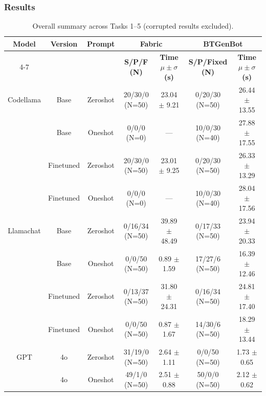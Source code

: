 \documentclass[letterpaper, 10pt, conference]{ieeeconf}      %
\begin{document}
\subsubsection{Results}

\begin{table}[t]
\centering
\vspace{2ex} 
\caption{Overall summary across Tasks 1--5 (corrupted results excluded).}
\label{Table-Eval-Overall}
\vspace{1ex} 
    \begin{tabular}{|c|c|c|cc|cc|}
    \hline
    \textbf{Model} & \textbf{Version} & \textbf{Prompt} & \multicolumn{2}{c|}{\textbf{Fabric}} & \multicolumn{2}{c|}{\textbf{BTGenBot}} \\
    \cline{4-7}
    & & & \textbf{S/P/F (N)} & \textbf{Time $\mu\pm\sigma$ (s)} & \textbf{S/P/Fixed (N)} & \textbf{Time $\mu\pm\sigma$ (s)} \\
    \hline
    Codellama & Base      & Zeroshot & 20/30/0 (N=50) & 23.04 $\pm$ 9.21 & 0/20/30 (N=50) & 26.44 $\pm$ 13.55 \\
              & Base      & Oneshot  & 0/0/0 (N=0)    & ---              & 10/0/30 (N=40) & 27.88 $\pm$ 17.55 \\
              & Finetuned & Zeroshot & 20/30/0 (N=50) & 23.01 $\pm$ 9.25 & 0/20/30 (N=50) & 26.33 $\pm$ 13.29 \\
              & Finetuned & Oneshot  & 0/0/0 (N=0)    & ---              & 10/0/30 (N=40) & 28.04 $\pm$ 17.56 \\
    \hline
    Llamachat & Base      & Zeroshot & 0/16/34 (N=50) & 39.89 $\pm$ 48.49 & 0/17/33 (N=50) & 23.94 $\pm$ 20.33 \\
              & Base      & Oneshot  & 0/0/50 (N=50)  & 0.89 $\pm$ 1.59  & 17/27/6 (N=50) & 16.39 $\pm$ 12.46 \\
              & Finetuned & Zeroshot & 0/13/37 (N=50) & 31.80 $\pm$ 24.31 & 0/16/34 (N=50) & 24.81 $\pm$ 17.40 \\
              & Finetuned & Oneshot  & 0/0/50 (N=50)  & 0.87 $\pm$ 1.67  & 14/30/6 (N=50) & 18.29 $\pm$ 13.44 \\
    \hline
    GPT & 4o  & Zeroshot & 31/19/0 (N=50) & 2.64 $\pm$ 1.11 & 0/0/50 (N=50) & 1.73 $\pm$ 0.65 \\
        & 4o  & Oneshot  & 49/1/0 (N=50)  & 2.51 $\pm$ 0.88 & 50/0/0 (N=50) & 2.12 $\pm$ 0.62 \\

\end{tabular}
\end{table}
\end{document}
